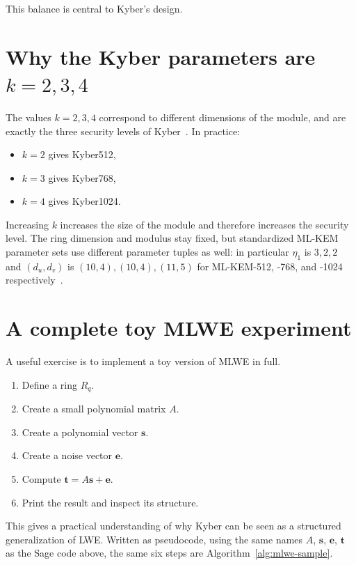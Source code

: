This balance is central to Kyber's design.

\section{Why the Kyber parameters are $k=2,3,4$}

The values $k=2,3,4$ correspond to different dimensions of the module, and are exactly the three security levels of Kyber~\cite{kyber2018,langlois2015}. In practice:

\begin{itemize}
    \item $k=2$ gives Kyber512,
    \item $k=3$ gives Kyber768,
    \item $k=4$ gives Kyber1024.
\end{itemize}

Increasing $k$ increases the size of the module and therefore increases the security level. The ring dimension and modulus stay fixed, but standardized ML-KEM parameter sets use different parameter tuples as well: in particular $\eta_1$ is $3,2,2$ and $(d_u,d_v)$ is $(10,4),(10,4),(11,5)$ for ML-KEM-512, -768, and -1024 respectively~\cite{fips203}.

\section{A complete toy MLWE experiment}

A useful exercise is to implement a toy version of MLWE in full.

\begin{enumerate}
    \item Define a ring $R_q$.
    \item Create a small polynomial matrix $A$.
    \item Create a polynomial vector $\mathbf{s}$.
    \item Create a noise vector $\mathbf{e}$.
    \item Compute $\mathbf{t}=A\mathbf{s}+\mathbf{e}$.
    \item Print the result and inspect its structure.
\end{enumerate}

This gives a practical understanding of why Kyber can be seen as a structured generalization of LWE. Written as pseudocode, using the same names $A$, $\mathbf{s}$, $\mathbf{e}$, $\mathbf{t}$ as the Sage code above, the same six steps are Algorithm~\ref{alg:mlwe-sample}.

